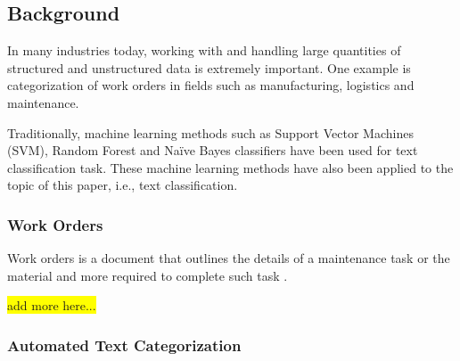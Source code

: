 \documentclass{article}
\begin{document}
\subsection{Background}








In many industries today, working with and handling large quantities of structured and unstructured data is extremely
important. One example is categorization of work orders in fields such as manufacturing, logistics and maintenance.
\bigskip

Traditionally, machine learning methods such as Support Vector Machines (SVM), Random Forest and Naïve Bayes classifiers
have been used for text classification task. These machine learning methods have also been applied to the topic of 
this paper, i.e., text classification. 


\subsubsection{Work Orders}

Work orders is a document that outlines the details of a maintenance task or the material and more required
to complete such task \cite{ibm2023}.

\colorbox{yellow}{add more here...}

\subsubsection{Automated Text Categorization}
\end{document}
